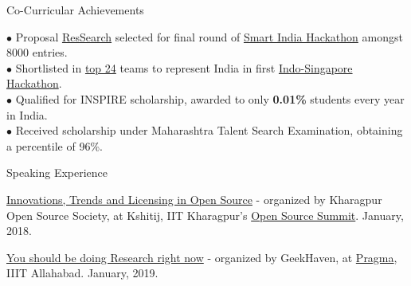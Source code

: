 \documentclass{resume} %
\begin{document}

\begin{rSection}{Co-Curricular Achievements}

$\bullet$ Proposal \href{https://docs.google.com/presentation/d/1ndJbIQCxFEf__I55yOOME-a_UGWDv1KMlukVE2lbDeA/}{ResSearch} selected for final round of \href{https://drive.google.com/open?id=0B5iU6cWw36rOamZLWHZENWdlY0k}{Smart India Hackathon} amongst 8000 entries. \\
$\bullet$ Shortlisted in \href{https://www.aicte-india.org/sites/default/files/Shortlisted and waitlisted Teams indo singapore hackathon 2018.pdf}{top 24} teams to represent India in first \href{http://www.ntu.edu.sg/events/events/Pages/Singapore-India-Hackathon-20181002-2080.aspx}{Indo-Singapore Hackathon}.\\
$\bullet$ Qualified for INSPIRE scholarship, awarded to only \textbf{0.01\%} students every year in India. \\
$\bullet$ Received scholarship under Maharashtra Talent Search Examination, obtaining a percentile of 96\%.

\begin{rSubsection}{\large Speaking Experience}{}{}{}

\item \href{https://www.youtube.com/watch?v=lk4ciY3NSbA}{Innovations, Trends and Licensing in Open Source} - organized by Kharagpur Open Source Society, at Kshitij, IIT Kharagpur's \href{https://www.facebook.com/events/1387262571380225/}{Open Source Summit}. January, 2018.
\item \href{https://twitter.com/IIITAPragma/status/1085833015995953152}{You should be doing Research right now} - organized by GeekHaven, at \href{https://pragmaconf.tech}{Pragma}, IIIT Allahabad. January, 2019.


\end{rSubsection}
\end{rSection}
\end{document}
